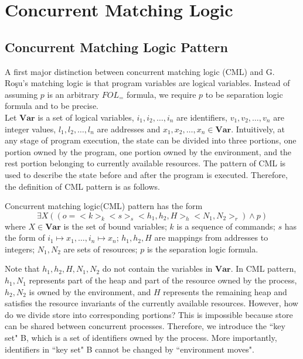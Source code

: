 \documentclass{lmcs} %
\theoremstyle{plain}\newtheorem{satz}[thm]{Satz} %
\begin{document}
\section*{Concurrent Matching Logic}
\subsection*{Concurrent Matching Logic Pattern}
A first major distinction between concurrent matching logic (CML) and G. Ro\c{s}u's matching logic is that program variables are logical variables. Instead of assuming $p$ is an arbitrary $\mathit{FOL}_=$ formula, we require $p$ to be separation logic formula and to be precise.\\
Let $\mathbf{Var}$ is a set of logical variables, $i_1,i_2,\ldots,i_n$ are identifiers, $v_1,v_2,\ldots,v_n$ are integer values, $l_1,l_2,\ldots,l_n$ are addresses and $x_1,x_2,\ldots,x_n \in \mathbf{Var}$. Intuitively, at any stage of program execution, the state can be divided into three portions, one portion owned by the program, one portion owned by the environment, and the rest portion belonging to currently available resources. The pattern of CML is used to describe the state before and after the program is executed. Therefore, the definition of CML pattern is as follows.
\begin{defi}
Concurrent matching logic(CML) pattern has the form
$$ \exists X((o=<\!\!k\!\!>_k<\!\!s\!\!>_s<\!\!h_1,h_2,H\!\!>_h<\!\!N_1,N_2\!\!>_r)\land p)$$
where $X\in \mathbf{Var}$ is the set of bound variables; $k$ is a sequence of commands; $s$ has the form of $i_1\mapsto x_1,\ldots, i_n\mapsto x_n$; $h_1,h_2,H$ are mappings from addresses to integers; $N_1,N_2$ are sets of resources; $p$ is the separation logic formula.
\end{defi}
Note that $h_1,h_2,H,N_1,N_2$ do not contain the variables in $\mathbf{Var}$. In CML pattern, $h_1,N_1$ represents part of the heap and part of the resource owned by the process, $h_2,N_2$ is owned by the environment, and $H$ represents the remaining heap and satisfies the resource invariants of the currently available resources. However, how do we divide store into corresponding  portions? This is impossible because store can be shared between concurrent processes. Therefore, we introduce the ``key set" B, which is a set of identifiers owned by the process. More importantly, identifiers in ``key set" B cannot be changed by ``environment moves".
\end{document}
